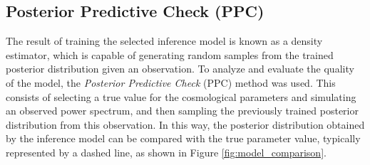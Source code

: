\subsection{Posterior Predictive Check (PPC)}
The result of training the selected inference model is known as a density estimator, which is capable of generating random samples from the trained posterior distribution given an observation. To analyze and evaluate the quality of the model, the \textit{Posterior Predictive Check} (PPC) \cite{SBI} method was used. This consists of selecting a true value for the cosmological parameters and simulating an observed power spectrum, and then sampling the previously trained posterior distribution from this observation. In this way, the posterior distribution obtained by the inference model can be compared with the true parameter value, typically represented by a dashed line, as shown in Figure \ref{fig:model_comparison}.



